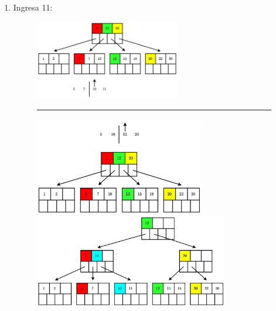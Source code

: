 \documentclass{templateNote}
\begin{document}
\begin{itemize}
\begin{enumerate}
\begin{enumerate}
\begin{enumerate}
                \newpage
                \item Ingresa 11:
                \begin{figure}[H]
                    \centering
                    \includegraphics[width=0.6\textwidth]{diagram/P3-1-12-1.png}
                    \rule{\textwidth}{1pt}
                    \includegraphics[width=0.7\textwidth]{diagram/P3-1-12-2.png}
                    \includegraphics[width=0.8\textwidth]{diagram/P3-1-12-3.png}
                \end{figure}


\end{enumerate}
\end{enumerate}
\end{enumerate}
\end{itemize}
\end{document}
